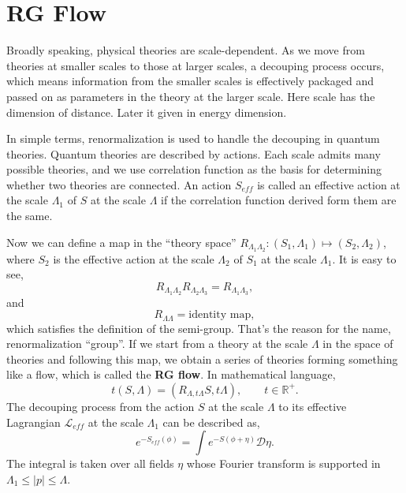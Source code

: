 \documentclass[a4paper,12pt]{article}
\begin{document}
\section{RG Flow\cite{Coleman_1985,Deligne:1999qp}}
Broadly speaking, physical theories are scale-dependent. As we move from theories at smaller scales to those at larger scales,
a decouping process occurs, which means information from the smaller scales is effectively packaged and passed on as parameters 
in the theory at the larger scale. Here scale has the dimension of distance. Later it given in energy dimension.\par
In simple terms, renormalization is used to handle the decouping in quantum theories. Quantum theories are described by actions.
Each scale admits many possible theories, and we use correlation function as the basis for determining whether two theories are connected.
An action $S_{eff}$ is called an effective action at the scale $\Lambda_1$ of $S$ at the scale $\Lambda$ if 
the correlation function derived form them are the same.\par
Now we can define a map in the ``theory space'' $R_{\Lambda_1 \Lambda_2}:(S_1,\Lambda_1)\mapsto(S_2,\Lambda_2)$, where
$S_2$ is the effective action at the scale $\Lambda_2$ of $S_1$ at the scale $\Lambda_1$. It is easy to see,
\begin{equation}
    R_{\Lambda_1\Lambda_2}R_{\Lambda_2\Lambda_3}=R_{\Lambda_1\Lambda_3},
\end{equation}    
and
\begin{equation}
    R_{\Lambda \Lambda}=\text{identity map},
\end{equation}
which satisfies the definition of the semi-group. That's the reason for the name, renormalization ``group''. 
If we start from a theory at the scale $\Lambda$ in the space of theories and following this map, we obtain a series
of theories forming something like a flow, which is called the \textbf{RG flow}. In mathematical language,
\begin{equation}
    t(S,\Lambda)=(R_{\Lambda,t \Lambda}S,t \Lambda),\qquad t\in \mathbb{R}^+.
\end{equation}
The decouping process from the action $S$ at the scale $\Lambda$ to its effective Lagrangian $\mathcal{L}_{eff}$ at the scale $\Lambda_1$
 can be described as,
\begin{equation}
    \label{wilson-pic}
e^{-S_{eff}(\phi)}=\int e^{-S(\phi+\eta)}\mathcal{D}\eta.
\end{equation}
The integral is taken over all fields $\eta$ whose Fourier transform is supported in $\Lambda_1 \leq |p|\leq \Lambda$. 
\end{document}
